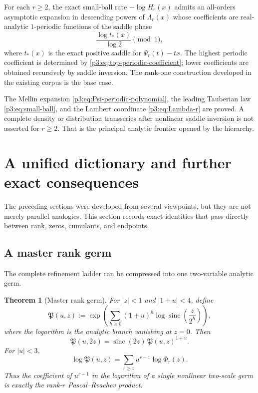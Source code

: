 \documentclass[11pt,oneside]{article}
\newtheorem{theorem}{Theorem}[section]
\theoremstyle{definition}
\theoremstyle{remark}
\newcommand{\sinc}{\operatorname{sinc}}
\begin{document}
\begin{conjecture}\label{p3:conj:full-endpoint}
For each $r\ge2$, the exact small-ball rate $-\log H_r(x)$ admits an all-orders asymptotic expansion in descending powers of $\Lambda_r(x)$ whose coefficients are real-analytic $1$-periodic functions of the saddle phase
\[
  \frac{\log t_*(x)}{\log2}\pmod1,
\]
where $t_*(x)$ is the exact positive saddle for $\Psi_r(t)-tx$.  The highest periodic coefficient is determined by \eqref{p3:eq:top-periodic-coefficient}; lower coefficients are obtained recursively by saddle inversion.  The rank-one construction developed in the existing corpus is the base case.
\end{conjecture}

\begin{cautionbox}
The Mellin expansion \eqref{p3:eq:Psi-periodic-polynomial}, the leading Tauberian law \eqref{p3:eq:small-ball}, and the Lambert coordinate \eqref{p3:eq:Lambda-r} are proved.  A complete density or distribution transseries after nonlinear saddle inversion is not asserted for $r\ge2$.  That is the principal analytic frontier opened by the hierarchy.
\end{cautionbox}


\section{A unified dictionary and further exact consequences}\label{p3:sec:synthesis}

The preceding sections were developed from several viewpoints, but they are not merely parallel analogies.  This section records exact identities that pass directly between rank, zeros, cumulants, and endpoints.

\subsection{A master rank germ}

The complete refinement ladder can be compressed into one two-variable analytic germ.

\begin{theorem}[Master rank germ]\label{p3:thm:master-rank-germ}
For $|z|<1$ and $|1+u|<4$, define
\begin{equation}\label{p3:eq:master-rank-germ}
 \mathfrak P(u,z):=
 \exp\!\left(
   \sum_{h\ge0}(1+u)^h
   \log\sinc\!\left(\frac z{2^h}\right)
 \right),
\end{equation}
where the logarithm is the analytic branch vanishing at $z=0$.  Then
\begin{equation}\label{p3:eq:master-nonlinear-refinement}
 \boxed{\quad
 \mathfrak P(u,2z)=\sinc(2z)\,\mathfrak P(u,z)^{1+u}.
 \quad}
\end{equation}
For $|u|<3$,
\begin{equation}\label{p3:eq:master-rank-coefficients}
 \log\mathfrak P(u,z)
 =\sum_{r\ge1}u^{r-1}\log\Phi_r(z).
\end{equation}
Thus the coefficient of $u^{r-1}$ in the logarithm of a single nonlinear two-scale germ is exactly the rank-$r$ Pascal--Rvachev product.
\end{theorem}
\end{document}
